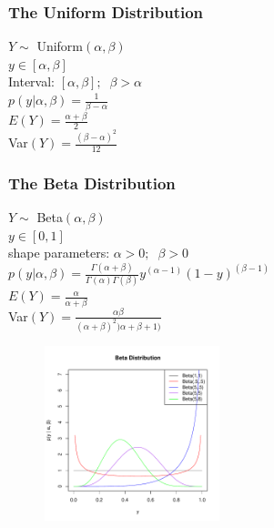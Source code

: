 \documentclass{beamer}
\begin{document}
\begin{frame}
\frametitle{The Uniform Distribution}
\pause
$Y \sim$ Uniform$(\alpha, \beta)$\\
\bigskip
\pause
$y \in [\alpha, \beta]$\\
\bigskip
\pause
Interval: $[\alpha, \beta]; \; \; \beta > \alpha$\\
\bigskip
\pause
$p(y| \alpha, \beta) = \frac{1}{\beta - \alpha}$\\
\bigskip
\bigskip
\pause
$E(Y) = \frac{\alpha + \beta}{2}$\\
\bigskip
\pause
Var$(Y) = \frac{(\beta - \alpha)^2}{12}$

\end{frame}



\begin{frame}
\frametitle{The Beta Distribution}
\begin{multicols}{2}
\pause
$Y \sim$ Beta$(\alpha, \beta)$\\
\bigskip
\pause
$y \in [0,1]$\\
\bigskip
\pause
shape parameters: $\alpha > 0; \; \; \beta > 0$\\
\bigskip
\pause
$p(y| \alpha, \beta) = \frac{\Gamma (\alpha + \beta)}{\Gamma (\alpha)
\Gamma (\beta)} y^{(\alpha - 1)} (1 - y)^{(\beta-1)}$\\
\bigskip
\bigskip
\pause
$E(Y) = \frac{\alpha}{\alpha + \beta}$\\
\bigskip
\pause
Var$(Y) = \frac{\alpha \beta}{(\alpha + \beta)^2 )\alpha + \beta + 1)}$


\begin{figure}[!htp]
\begin{center}
\includegraphics[width=2in, height=2in]{probability-beta.pdf}
\end{center}
\end{figure}
\end{multicols}

\end{frame}
\end{document}
